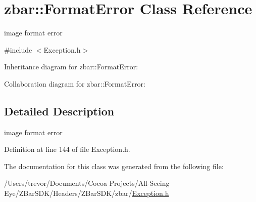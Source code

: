 \hypertarget{classzbar_1_1_format_error}{
\section{zbar::FormatError Class Reference}
\label{classzbar_1_1_format_error}
}


image format error  




{\ttfamily \#include $<$Exception.h$>$}



Inheritance diagram for zbar::FormatError:


Collaboration diagram for zbar::FormatError:


\subsection{Detailed Description}
image format error 

Definition at line 144 of file Exception.h.



The documentation for this class was generated from the following file:\begin{DoxyCompactItemize}
\item 
/Users/trevor/Documents/Cocoa Projects/All-\/Seeing Eye/ZBarSDK/Headers/ZBarSDK/zbar/\hyperlink{_exception_8h}{Exception.h}\end{DoxyCompactItemize}
